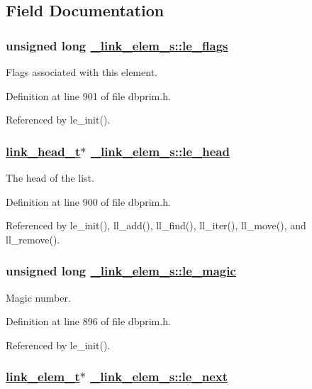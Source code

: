 \subsection{Field Documentation}
\hypertarget{struct__link__elem__s_o5}{
\subsubsection[le\_\-flags]{\setlength{\rightskip}{0pt plus 5cm}unsigned long \hyperlink{struct__link__elem__s_o5}{\_\-link\_\-elem\_\-s::le\_\-flags}}}
\label{struct__link__elem__s_o5}


Flags associated with this element. 

Definition at line 901 of file dbprim.h.

Referenced by le\_\-init().\hypertarget{struct__link__elem__s_o4}{
\subsubsection[le\_\-head]{\setlength{\rightskip}{0pt plus 5cm}\hyperlink{struct__link__head__s}{link\_\-head\_\-t}$\ast$ \hyperlink{struct__link__elem__s_o4}{\_\-link\_\-elem\_\-s::le\_\-head}}}
\label{struct__link__elem__s_o4}


The head of the list. 

Definition at line 900 of file dbprim.h.

Referenced by le\_\-init(), ll\_\-add(), ll\_\-find(), ll\_\-iter(), ll\_\-move(), and ll\_\-remove().\hypertarget{struct__link__elem__s_o0}{
\subsubsection[le\_\-magic]{\setlength{\rightskip}{0pt plus 5cm}unsigned long \hyperlink{struct__link__elem__s_o0}{\_\-link\_\-elem\_\-s::le\_\-magic}}}
\label{struct__link__elem__s_o0}


Magic number. 

Definition at line 896 of file dbprim.h.

Referenced by le\_\-init().\hypertarget{struct__link__elem__s_o1}{
\subsubsection[le\_\-next]{\setlength{\rightskip}{0pt plus 5cm}\hyperlink{struct__link__elem__s}{link\_\-elem\_\-t}$\ast$ \hyperlink{struct__link__elem__s_o1}{\_\-link\_\-elem\_\-s::le\_\-next}}}
\label{struct__link__elem__s_o1}


